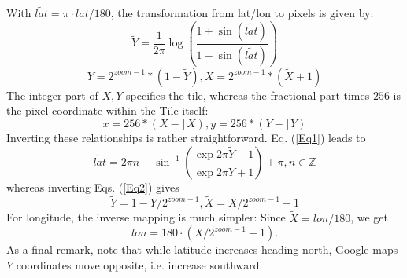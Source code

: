 \documentclass{article}
\begin{document}
\noindent
With   $\tilde{lat} = \pi \cdot lat /180$, the transformation from lat/lon to pixels is given by:
\begin{equation}   
\label{Eq1}
  \tilde{Y} = \frac{1}{2 \pi}  \log{\left( \frac{1 + \sin{(\tilde{lat})}}{1 -\sin{(\tilde{lat})} } \right)}
\end{equation} 
\begin{equation} 
\label{Eq2}  
  Y = 2^{zoom-1} * (1 - \tilde{Y}) ,  X = 2^{zoom-1} * (\tilde{X} + 1) 
\end{equation} 
The integer part of $X, Y$ specifies the tile, whereas the fractional part times $256$ is the pixel coordinate within the Tile itself:
\[
 x = 256 *(X- \lfloor{X}), y = 256 *(Y- \lfloor{Y})
\]
Inverting these relationships is rather straightforward.
Eq. (\ref{Eq1}) leads to 
\begin{equation}
  \tilde{lat} = 2 \pi n \pm  \sin^{-1}{\left( \frac{\exp{ 2 \pi \tilde{Y}} - 1}{\exp{ 2 \pi \tilde{Y}} + 1} \right)} + \pi  , n \in \mathbb{Z}
\end{equation}
whereas inverting Eqs. (\ref{Eq2})  gives
\[
\tilde{Y} = 1 - Y/2^{zoom-1} , \tilde{X} =  X/2^{zoom-1} - 1
\]
For longitude, the inverse mapping is much simpler:
Since $\tilde{X} = lon / 180 $, we get
 \[ 
lon =  180 \cdot \left( X/2^{zoom-1} - 1 \right).
\]
As a final remark, note that while latitude increases heading north, Google maps $Y$ coordinates move opposite, i.e. increase southward.
\end{document}
